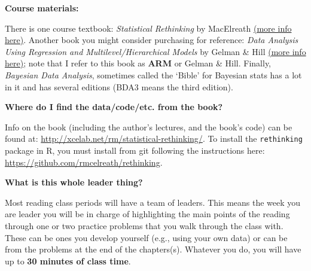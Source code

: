 \documentclass[11pt]{article}
\begin{document}

\begin{large}
{\raggedright \textbf{Course materials:}}
\end{large}
\noindent There is one course textbook: \emph{Statistical Rethinking} by MacElreath \href{http://xcelab.net/rm/statistical-rethinking/}{(more info here)}. Another book you might consider purchasing for reference: \emph{Data Analysis Using Regression and Multilevel/Hierarchical Models} by Gelman \& Hill \href{http://www.stat.columbia.edu/~gelman/arm/}{(more info here)}; note that I refer to this book as {\bf ARM} or Gelman \& Hill. Finally, \emph{Bayesian Data Analysis}, sometimes called the `Bible' for Bayesian stats has a lot in it and has several editions (BDA3 means the third edition).  \\ %

\begin{large} 
{\raggedright \textbf{Where do I find the data/code/etc. from the book?}}
\end{large} Info on the book (including the author's lectures, and the book's code) can be found at: \url{http://xcelab.net/rm/statistical-rethinking/}. To install the \verb|rethinking| package in R, you must install from git following the instructions here: \url{https://github.com/rmcelreath/rethinking}.\\

\begin{large} 
{\raggedright \textbf{What is this whole leader thing?}}
\end{large} Most reading class periods will have a team of leaders. This means the week you are leader you will be in charge of highlighting the main points of the reading through one or two practice problems that you walk through the class with. These can be ones you develop yourself (e.g., using your own data) or can be from the problems at the end of the chapters(s). Whatever you do, you will have up to {\bf 30 minutes of class time}. \\
\end{document}
